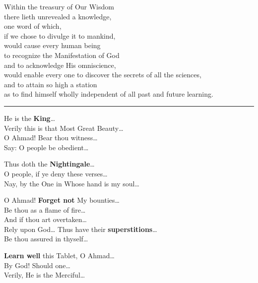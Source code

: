 \documentclass[14pt]{extarticle}
\begin{document}
\newpage

\begin{hafez}{}{}
  Within the treasury of Our Wisdom \\
    \mbox{\hspace{0.1in}}there lieth unrevealed a knowledge, \\
  one word of which, \\
    \mbox{\hspace{0.1in}}if we chose to divulge it to mankind, \\
  would cause every human being \\
    \mbox{\hspace{0.1in}}to recognize the Manifestation of God \\
    \mbox{\hspace{0.1in}}and to acknowledge His omniscience, \\
  would enable every one to discover the secrets of all the sciences, \\
    \mbox{\hspace{0.1in}}and to attain so high a station \\
    \mbox{\hspace{0.1in}}as to find himself wholly independent of all past and future learning.
\end{hafez}

\noindent\rule{2cm}{0.4pt}

\begin{hafez}{}{}
  He is the \textbf{King}\dots{} \\
  Verily this is that Most Great Beauty\dots{} \\
  O Ahmad! Bear thou witness\dots{} \\
  Say: O people be obedient\dots{}

  Thus doth the \textbf{Nightingale}\dots{} \\
  O people, if ye deny these verses\dots{} \\
  Nay, by the One in Whose hand is my soul\dots{}

  O Ahmad! \textbf{Forget not} My bounties\dots{} \\
  Be thou as a flame of fire\dots{} \\
  And if thou art overtaken\dots{} \\
  Rely upon God\dots{}
  Thus have their \textbf{superstitions}\dots{} \\
  Be thou assured in thyself\dots{}

  \textbf{Learn well} this Tablet, O Ahmad\dots{} \\
  By God! Should one\dots{} \\
  Verily, He is the Merciful\dots{}
\end{hafez}{}
\end{document}
